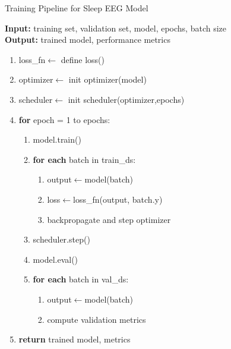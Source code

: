 \begin{algorithm}[H]
	\caption{Training Pipeline for Sleep EEG Model}
	\label{alg:training_pipeline}
	\textbf{Input:} training set, validation set, model, epochs, batch size \\
	\textbf{Output:} trained model, performance metrics
	\begin{enumerate}
		\item loss\_fn$\leftarrow$ define loss()
		\item optimizer$\leftarrow$ init optimizer(model)
		\item scheduler$\leftarrow$ init scheduler(optimizer,epochs)
		\item \textbf{for} epoch = 1 to epochs:
		\begin{enumerate}
			\item model.train()
			\item \textbf{for each} batch in train\_ds:
			\begin{enumerate}
				\item output$\leftarrow$model(batch)
				\item loss$\leftarrow$loss\_fn(output, batch.y)
				\item backpropagate and step optimizer
			\end{enumerate}
			\item scheduler.step()
			\item model.eval()
			\item \textbf{for each} batch in val\_ds:
			\begin{enumerate}
				\item output$\leftarrow$model(batch)
				\item compute validation metrics
			\end{enumerate}
		\end{enumerate}
		\item \textbf{return} trained model, metrics
	\end{enumerate}
\end{algorithm}

